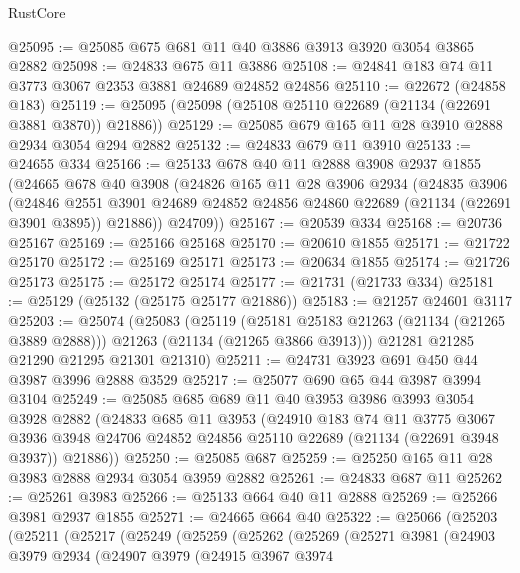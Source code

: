 \begin{lexlean}{RustCore}
\begin{coremodule}
@25095 := @25085 @675 @681 @11 @40 @3886 @3913 @3920 @3054 @3865 @2882
@25098 := @24833 @675 @11 @3886
@25108 := @24841 @183 @74 @11 @3773 @3067 @2353 @3881 @24689 @24852 @24856
@25110 := @22672 (@24858 @183)
@25119 := @25095 (@25098 (@25108 @25110 @22689 (@21134 (@22691 @3881 @3870)) @21886))
@25129 := @25085 @679 @165 @11 @28 @3910 @2888 @2934 @3054 @294 @2882
@25132 := @24833 @679 @11 @3910
@25133 := @24655 @334
@25166 := @25133
    @678
    @40
    @11
    @2888
    @3908
    @2937
    @1855
    (@24665
      @678
      @40
      @3908
      (@24826
        @165
        @11
        @28
        @3906
        @2934
        (@24835
          @3906
          (@24846
            @2551
            @3901
            @24689
            @24852
            @24856
            @24860
            @22689
            (@21134 (@22691 @3901 @3895))
            @21886))
        @24709))
@25167 := @20539 @334
@25168 := @20736 @25167
@25169 := @25166 @25168
@25170 := @20610 @1855
@25171 := @21722 @25170
@25172 := @25169 @25171
@25173 := @20634 @1855
@25174 := @21726 @25173
@25175 := @25172 @25174
@25177 := @21731 (@21733 @334)
@25181 := @25129 (@25132 (@25175 @25177 @21886))
@25183 := @21257 @24601 @3117
@25203 := @25074
    (@25083
      (@25119
        (@25181 @25183 @21263 (@21134 (@21265 @3889 @2888)))
        @21263
        (@21134 (@21265 @3866 @3913)))
      @21281
      @21285
      @21290
      @21295
      @21301
      @21310)
@25211 := @24731 @3923 @691 @450 @44 @3987 @3996 @2888 @3529
@25217 := @25077 @690 @65 @44 @3987 @3994 @3104
@25249 := @25085
    @685
    @689
    @11
    @40
    @3953
    @3986
    @3993
    @3054
    @3928
    @2882
    (@24833
      @685
      @11
      @3953
      (@24910
        @183
        @74
        @11
        @3775
        @3067
        @3936
        @3948
        @24706
        @24852
        @24856
        @25110
        @22689
        (@21134 (@22691 @3948 @3937))
        @21886))
@25250 := @25085 @687
@25259 := @25250 @165 @11 @28 @3983 @2888 @2934 @3054 @3959 @2882
@25261 := @24833 @687 @11
@25262 := @25261 @3983
@25266 := @25133 @664 @40 @11 @2888
@25269 := @25266 @3981 @2937 @1855
@25271 := @24665 @664 @40
@25322 := @25066
    (@25203
      (@25211
        (@25217
          (@25249
            (@25259
              (@25262
                (@25269
                  (@25271
                    @3981
                    (@24903
                      @3979
                      @2934
                      (@24907
                        @3979
                        (@24915
                          @3967
                          @3974

\end{coremodule}
\end{lexlean}

